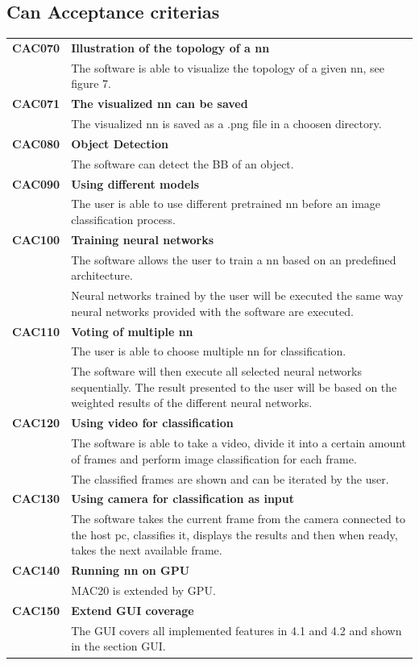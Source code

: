 \documentclass[parskip=full]{scrartcl}
\begin{document}
\subsection{Can Acceptance criterias}
\begin{tabular}{p{2cm}p{12cm}}
\textbf{CAC070} & \textbf{Illustration of the topology of a nn} \\
& The software is able to visualize the topology of a given \gls{nn}, see figure 7. \\
\textbf{CAC071} & \textbf{The visualized nn can be saved}\\
& The visualized nn is saved as a .png file in a choosen directory.\\
\textbf{CAC080} & \textbf{Object Detection} \\
& The software can detect the BB of an object. \\ 
\textbf{CAC090} &  \textbf{Using different models}\\
& The user is able to use different pretrained \gls{nn} before an image classification process. \\
\textbf{CAC100} & \textbf{Training neural networks} \\
& The software allows the user to train a \gls{nn} based on an predefined architecture.\\
& Neural networks trained by the user will be executed the same way neural networks provided with the software are executed.\\
\textbf{CAC110} & \textbf{Voting of multiple nn} \\
& The user is able to choose multiple nn for classification.\\
& The software will then execute all selected neural networks sequentially. The result presented to the user will be based on the weighted results of the different neural networks.\\
\textbf{CAC120} & \textbf{Using video for classification} \\
& The software is able to take a video, divide it into a certain amount of frames and perform image classification for each frame.\\
& The classified frames are shown and can be iterated by the user. \\
\textbf{CAC130} & \textbf{Using camera for classification as input} \\
& The software takes the current frame from the camera connected to the host pc, classifies it, displays the results and then when ready, takes the next available frame.\\
\textbf{CAC140} & \textbf{Running \gls{nn} on GPU}\\
& MAC20 is extended by GPU.\\
\textbf{CAC150} & \textbf{Extend GUI coverage}\\
& The GUI covers all implemented features in 4.1 and 4.2 and shown in the section GUI.
\end{tabular}
\end{document}
